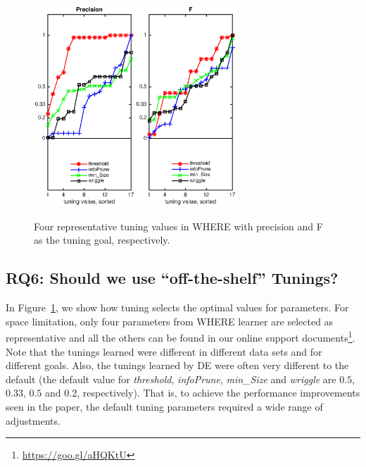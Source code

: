 \documentclass{sig-alternative}
\newcommand{\fig}[1]{Figure~\ref{fig:#1}}
\begin{document}
\begin{figure}[!t]
\begin{center}
\includegraphics[width=1.5in]{features_precision.eps}\includegraphics[width=1.5in]{features_F.eps}
 \end{center}
\caption{Four representative tuning values in WHERE with  precision and F as the tuning goal, respectively.   }\label{fig:features}
 \end{figure}


\subsection{RQ6: Should we use ``off-the-shelf'' Tunings?}\label{sect:variance}
 
 In \fig{features}, we show how tuning selects the optimal values for parameters. For space limitation, only four parameters from WHERE learner are selected as representative and all the others can be found in our online support documents\footnote{\url{https://goo.gl/aHQKtU}}.
 Note that
 the tunings learned were different in different data sets and for different goals.
Also, the tunings learned by DE
were often very different to the default (the default value for {\em threshold}, {\em infoPrune}, {\em min\_Size} and {\em wriggle} are $0.5$, $0.33$, $0.5$ and $0.2$, respectively). That is, to achieve the performance improvements seen in the paper,
the default tuning parameters required a wide range of adjustments.
\end{document}
